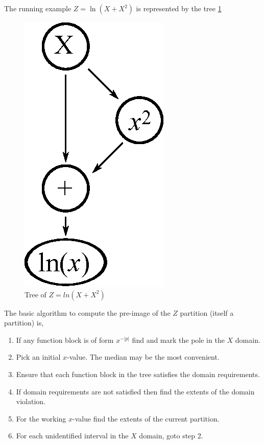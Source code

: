 The running example $Z = \ln(X + X^2)$ is represented by the tree \ref{fig:ln_x_plus_x2}

\begin{figure}
  \centering
  \includegraphics{Images/ln_x_plus_x2.eps}
  \caption[Tree of $Z = ln(X + X^2)$]
          {Tree of $Z = ln(X + X^2)$}
  \label{fig:ln_x_plus_x2}
\end{figure}


The basic algorithm to compute the pre-image of the $Z$ partition (itself a partition) is,

\begin{enumerate}
\item If any function block is of form $x^{-|p|}$ find and mark the pole in the $X$ domain.
\item Pick an initial $x$-value. The median may be the most convenient.
\item Ensure that each function block in the tree satisfies the domain requirements.
\item If domain requirements are not satisfied then find the extents of the domain violation.
\item For the working $x$-value find the extents of the current partition.
\item For each unidentified interval in the $X$ domain, goto step 2.
\end{enumerate}

